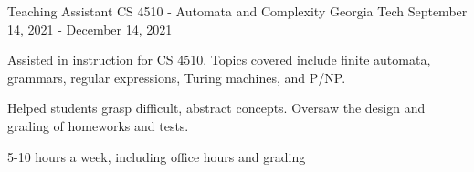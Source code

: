 
\begin{cventries}

\cventry
        {Teaching Assistant} %
        {CS 4510 - Automata and Complexity} %
        {Georgia Tech} %
        {September 14, 2021 - December 14, 2021} %
        {
          \begin{cvitems} %
            \item {Assisted in instruction for CS 4510. Topics covered include finite automata, grammars, regular expressions, Turing machines, and P/NP.}
            \item {Helped students grasp difficult, abstract concepts. Oversaw the design and grading of homeworks and tests.}
            \item 5-10 hours a week, including office hours and grading
          \end{cvitems}
        }
\end{cventries}
